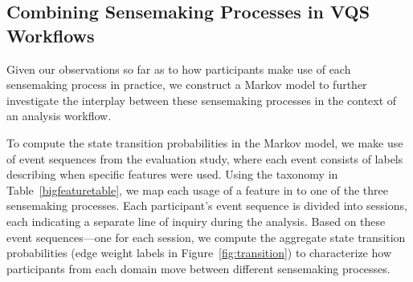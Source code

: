  \subsection{Combining Sensemaking Processes in VQS Workflows}
 Given our observations so far as to how participants make use of each sensemaking process in practice, we construct a Markov model to further investigate the interplay between these sensemaking processes in the context of an analysis workflow.  %
 \par To compute the state transition probabilities in the Markov model, we make use of event sequences from the evaluation study, where each event consists of labels describing when specific features were used. Using the taxonomy in Table~\ref{bigfeaturetable}, we map each usage of a feature in \zvpp to one of the three sensemaking processes. Each participant's event sequence is divided into sessions, each indicating a separate line of inquiry during the analysis. Based on these event sequences---one for each session, we compute the aggregate state transition probabilities (edge weight labels in Figure~\ref{fig:transition}) to characterize how participants from each domain move between different sensemaking processes. 
